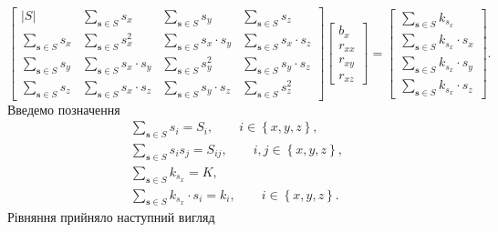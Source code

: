 \begin{equation*}
  \begin{bmatrix}
    \left| S \right| & \sum \limits_{\boldsymbol{s} \in S} s_x & \sum \limits_{\boldsymbol{s} \in S} s_y & \sum \limits_{\boldsymbol{s} \in S} s_z \\
    \sum \limits_{\boldsymbol{s} \in S} s_x & \sum \limits_{\boldsymbol{s} \in S} s_x^2 & \sum \limits_{\boldsymbol{s} \in S} s_x \cdot s_y & \sum \limits_{\boldsymbol{s} \in S} s_x \cdot s_z \\
    \sum \limits_{\boldsymbol{s} \in S} s_y & \sum \limits_{\boldsymbol{s} \in S} s_x \cdot s_y & \sum \limits_{\boldsymbol{s} \in S} s_y^2 & \sum \limits_{\boldsymbol{s} \in S} s_y \cdot s_z \\
    \sum \limits_{\boldsymbol{s} \in S} s_z & \sum \limits_{\boldsymbol{s} \in S} s_x \cdot s_z & \sum \limits_{\boldsymbol{s} \in S} s_y \cdot s_z & \sum \limits_{\boldsymbol{s} \in S} s_z^2
  \end{bmatrix}
  \begin{bmatrix}
    b_x \\
    r_{xx} \\
    r_{xy} \\
    r_{xz}
  \end{bmatrix} =
  \begin{bmatrix}
    \sum \limits_{\boldsymbol{s} \in S} k_{s_x} \\
    \sum \limits_{\boldsymbol{s} \in S} k_{s_x} \cdot s_x \\
    \sum \limits_{\boldsymbol{s} \in S} k_{s_x} \cdot s_y \\
    \sum \limits_{\boldsymbol{s} \in S} k_{s_x} \cdot s_z
  \end{bmatrix}.
\end{equation*}
Введемо позначення
\begin{gather*}
  \sum \limits_{\boldsymbol{s} \in S} s_i = S_i, \qquad i \in \left\{x, y, z \right\}, \\
  \sum \limits_{\boldsymbol{s} \in S} s_i s_j = S_{ij}, \qquad i, j \in \left\{ x, y, z \right\}, \\
  \sum \limits_{\boldsymbol{s} \in S} k_{s_x} = K, \\
  \sum \limits_{\boldsymbol{s} \in S} k_{s_x} \cdot s_i = k_i, \qquad i \in \left\{ x, y, z \right\}.
\end{gather*}
Рівняння прийняло наступний вигляд
